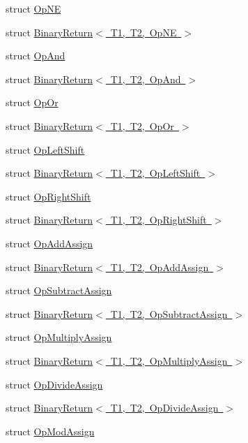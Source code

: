 \begin{DoxyCompactItemize}
\item 
struct \mbox{\hyperlink{structOpNE}{Op\+NE}}
\item 
struct \mbox{\hyperlink{structBinaryReturn_3_01T1_00_01T2_00_01OpNE_01_4}{Binary\+Return$<$ T1, T2, Op\+N\+E $>$}}
\item 
struct \mbox{\hyperlink{structOpAnd}{Op\+And}}
\item 
struct \mbox{\hyperlink{structBinaryReturn_3_01T1_00_01T2_00_01OpAnd_01_4}{Binary\+Return$<$ T1, T2, Op\+And $>$}}
\item 
struct \mbox{\hyperlink{structOpOr}{Op\+Or}}
\item 
struct \mbox{\hyperlink{structBinaryReturn_3_01T1_00_01T2_00_01OpOr_01_4}{Binary\+Return$<$ T1, T2, Op\+Or $>$}}
\item 
struct \mbox{\hyperlink{structOpLeftShift}{Op\+Left\+Shift}}
\item 
struct \mbox{\hyperlink{structBinaryReturn_3_01T1_00_01T2_00_01OpLeftShift_01_4}{Binary\+Return$<$ T1, T2, Op\+Left\+Shift $>$}}
\item 
struct \mbox{\hyperlink{structOpRightShift}{Op\+Right\+Shift}}
\item 
struct \mbox{\hyperlink{structBinaryReturn_3_01T1_00_01T2_00_01OpRightShift_01_4}{Binary\+Return$<$ T1, T2, Op\+Right\+Shift $>$}}
\item 
struct \mbox{\hyperlink{structOpAddAssign}{Op\+Add\+Assign}}
\item 
struct \mbox{\hyperlink{structBinaryReturn_3_01T1_00_01T2_00_01OpAddAssign_01_4}{Binary\+Return$<$ T1, T2, Op\+Add\+Assign $>$}}
\item 
struct \mbox{\hyperlink{structOpSubtractAssign}{Op\+Subtract\+Assign}}
\item 
struct \mbox{\hyperlink{structBinaryReturn_3_01T1_00_01T2_00_01OpSubtractAssign_01_4}{Binary\+Return$<$ T1, T2, Op\+Subtract\+Assign $>$}}
\item 
struct \mbox{\hyperlink{structOpMultiplyAssign}{Op\+Multiply\+Assign}}
\item 
struct \mbox{\hyperlink{structBinaryReturn_3_01T1_00_01T2_00_01OpMultiplyAssign_01_4}{Binary\+Return$<$ T1, T2, Op\+Multiply\+Assign $>$}}
\item 
struct \mbox{\hyperlink{structOpDivideAssign}{Op\+Divide\+Assign}}
\item 
struct \mbox{\hyperlink{structBinaryReturn_3_01T1_00_01T2_00_01OpDivideAssign_01_4}{Binary\+Return$<$ T1, T2, Op\+Divide\+Assign $>$}}
\item 
struct \mbox{\hyperlink{structOpModAssign}{Op\+Mod\+Assign}}

\end{DoxyCompactItemize}
